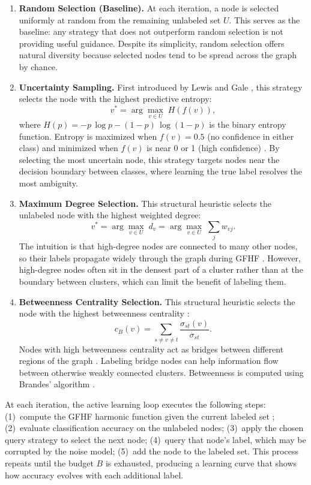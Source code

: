 \documentclass[12pt]{article}
\begin{document}
\begin{enumerate}

\item \textbf{Random Selection (Baseline).}
At each iteration, a node is selected uniformly at random from the remaining unlabeled set $U$. This serves as the baseline: any strategy that does not outperform random selection is not providing useful guidance. Despite its simplicity, random selection offers natural diversity because selected nodes tend to be spread across the graph by chance.

\item \textbf{Uncertainty Sampling.}
First introduced by Lewis and Gale \cite{Lewis1994}, this strategy selects the node with the highest predictive entropy:
\[
v^* = \arg\max_{v \in U}\; H(f(v)),
\]
where $H(p) = -p\,\log p - (1-p)\,\log(1-p)$ is the binary entropy function. Entropy is maximized when $f(v) = 0.5$ (no confidence in either class) and minimized when $f(v)$ is near 0 or 1 (high confidence) \cite{Settles2012}. By selecting the most uncertain node, this strategy targets nodes near the decision boundary between classes, where learning the true label resolves the most ambiguity.

\item \textbf{Maximum Degree Selection.}
This structural heuristic selects the unlabeled node with the highest weighted degree:
\[
v^* = \arg\max_{v \in U}\; d_v = \arg\max_{v \in U}\; \sum_j w_{vj}.
\]
The intuition is that high-degree nodes are connected to many other nodes, so their labels propagate widely through the graph during GFHF \cite{Zhu2003}. However, high-degree nodes often sit in the densest part of a cluster rather than at the boundary between clusters, which can limit the benefit of labeling them.

\item \textbf{Betweenness Centrality Selection.}
This structural heuristic selects the node with the highest betweenness centrality \cite{Freeman1977}:
\[
c_B(v) = \sum_{s \neq v \neq t} \frac{\sigma_{st}(v)}{\sigma_{st}}.
\]
Nodes with high betweenness centrality act as bridges between different regions of the graph \cite{Freeman1977}. Labeling bridge nodes can help information flow between otherwise weakly connected clusters. Betweenness is computed using Brandes' algorithm \cite{Brandes2001}.

\end{enumerate}

At each iteration, the active learning loop executes the following steps: (1)~compute the GFHF harmonic function given the current labeled set \cite{Zhu2003}; (2)~evaluate classification accuracy on the unlabeled nodes; (3)~apply the chosen query strategy to select the next node; (4)~query that node's label, which may be corrupted by the noise model; (5)~add the node to the labeled set. This process repeats until the budget $B$ is exhausted, producing a learning curve that shows how accuracy evolves with each additional label.
\end{document}
